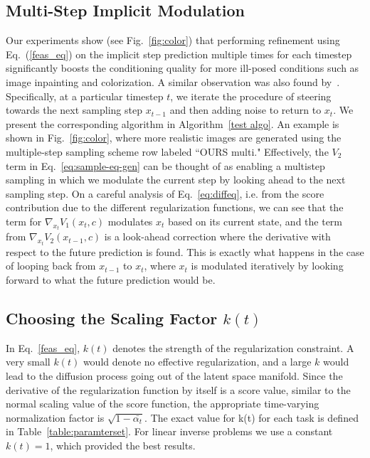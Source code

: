 \documentclass[10pt,twocolumn,letterpaper]{article}
\begin{document}
\subsection{Multi-Step Implicit Modulation}
\label{sec:multisample}
 Our experiments show (see Fig.~\ref{fig:color}) that performing refinement using Eq.~(\ref{feas_eq}) on the implicit step prediction multiple times for each timestep significantly boosts the conditioning quality for more ill-posed conditions such as image inpainting and colorization. A similar observation was also found by~\cite{lugmayr2022repaint}. Specifically, at a particular timestep $t$, we iterate the procedure of steering towards the next sampling step $x_{t-1}$ and then adding noise to return to $x_t$.
We present the corresponding algorithm in Algorithm~\ref{test algo}.  An example is shown in Fig.~\ref{fig:color}, where more realistic images are generated using the multiple-step sampling scheme row labeled ``OURS multi." Effectively, the $V_2$ term in Eq.~\eqref{eq:sample-eq-gen} can be thought of as enabling a multistep sampling in which we modulate the current step by looking ahead to the next sampling step. On a careful analysis of Eq.~\eqref{eq:diffeq}, i.e. from the score contribution due to the different regularization functions, we can see that the term for $\nabla_{x_t} V_1(x_t,c)$ modulates $x_t$ based on its current state, and the term from $\nabla_{x_{t}} V_2(x_{t-1},c)$ is a look-ahead correction where the derivative with respect to the future prediction is found. This is exactly what happens in the case of looping back from  $x_{t-1}$ to $x_{t}$, where $x_t$ is modulated iteratively by looking forward to what the future prediction would be. 

\subsection{Choosing the Scaling Factor ${k(t)}$}
In Eq.~\eqref{feas_eq}, $k(t)$ denotes the strength of the regularization constraint. A very small $k(t)$ would denote no effective regularization, and a large $k$ would lead to the diffusion process going out of the latent space manifold. Since the derivative of the regularization function by itself is a score value, similar to the normal scaling value of the score function, the appropriate time-varying normalization factor is $\sqrt{1-\bar{\alpha_t}}$. The exact value for k(t) for each task is defined in Table~\ref{table:paramterset}. For linear inverse problems we use a constant $k(t)=1$, which provided the best results.
\end{document}
